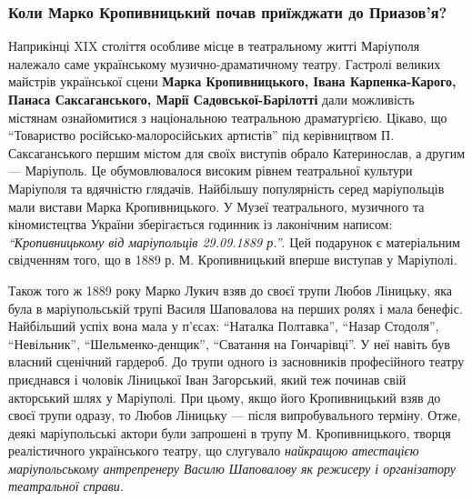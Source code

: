 
 
 
 
 

\subsubsection{Коли Марко Кропивницький почав приїжджати до Приазов'я?}

Наприкінці XIX століття особливе місце в театральному житті Маріуполя належало
саме українському музично-драматичному театру. Гастролі великих майстрів
української сцени \textbf{Марка Кропивницького, Івана Карпенка-Карого, Панаса
Саксаганського, Марії Садовської-Барілотті} дали можливість містянам
ознайомитися з національною театральною драматургією. Цікаво, що \enquote{Товариство
російсько-малоросійських артистів} під керівництвом П. Саксаганського першим
містом для своїх виступів обрало Катеринослав, а другим — Маріуполь. Це
обумовлювалося високим рівнем театральної культури Маріуполя та вдячністю
глядачів. Найбільшу популярність серед маріупольців мали вистави Марка
Кропивницького. У Музеї театрального, музичного та кіномистецтва України
зберігається годинник із лаконічним написом: \emph{\enquote{Кропивницькому від маріупольців
29.09.1889 р.}}. Цей подарунок є матеріальним свідченням того, що в 1889 р. М.
Кропивницький вперше виступав у Маріуполі.




Також того ж 1889 року Марко Лукич взяв до своєї трупи Любов Ліницьку, яка була
в маріупольській трупі Василя Шаповалова на перших ролях і мала бенефіс.
Найбільший успіх вона мала у п'єсах: \enquote{Наталка Полтавка}, \enquote{Назар Стодоля},
\enquote{Невільник}, \enquote{Шельменко-денщик}, \enquote{Сватання на Гончарівці}. У неї навіть був
власний сценічний гардероб. До трупи одного із засновників професійного театру
приєднався і чоловік Ліницької Іван Загорський, який теж починав свій
акторський шлях у Маріуполі. При цьому, якщо його Кропивницький взяв до своєї
трупи одразу, то Любов Ліницьку — після випробувального терміну. Отже, деякі
маріупольські актори були запрошені в трупу М. Кропивницького, творця
реалістичного українського театру, що слугувало \emph{найкращою атестацією
маріупольському антрепренеру Василю Шаповалову як режисеру і організатору
театральної справи.}

